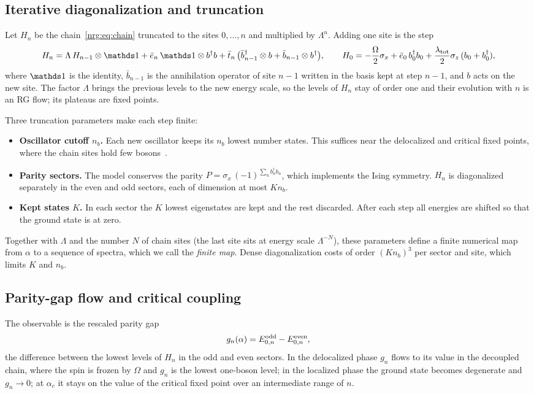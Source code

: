 \subsection{Iterative diagonalization and truncation}
Let $H_n$ be the chain~\eqref{nrg:eq:chain} truncated to the sites $0,\dots,n$ and multiplied by $\Lambda^n$. Adding one site is the step
\begin{equation}
H_{n}=\Lambda\,H_{n-1}\otimes\one+\bar e_n\,\one\otimes b^\dagger b
+\bar t_n\,\big(\bar b_{n-1}^\dagger\otimes b+\bar b_{n-1}\otimes b^\dagger\big),\qquad
H_0=-\frac{\Omega}{2}\sigma_x+\bar e_0\,b_0^\dagger b_0+\frac{\lambda_{\rm tot}}{2}\sigma_z\,(b_0+b_0^\dagger),
\label{nrg:eq:step}
\end{equation}
where $\one$ is the identity, $\bar b_{n-1}$ is the annihilation operator of site $n-1$ written in the basis kept at step $n-1$, and
$b$ acts on the new site. The factor $\Lambda$ brings the previous levels to the new energy scale, so the levels of $H_n$ stay of order
one and their evolution with $n$ is an RG flow; its plateaus are fixed points.

Three truncation parameters make each step finite:
\begin{itemize}
\item \textbf{Oscillator cutoff $n_b$.} Each new oscillator keeps its $n_b$ lowest number states. This suffices near the
  delocalized and critical fixed points, where the chain sites hold few bosons~\cite{nrg:Bulla2005}.
\item \textbf{Parity sectors.} The model conserves the parity $P=\sigma_x\,(-1)^{\sum_nb_n^\dagger b_n}$, which implements the Ising
  symmetry. $H_n$ is diagonalized separately in the even and odd sectors, each of dimension at most $Kn_b$.
\item \textbf{Kept states $K$.} In each sector the $K$ lowest eigenstates are kept and the rest discarded. After each step all
  energies are shifted so that the ground state is at zero.
\end{itemize}
Together with $\Lambda$ and the number $N$ of chain sites (the last site sits at energy scale $\Lambda^{-N}$), these parameters
define a finite numerical map from $\alpha$ to a sequence of spectra, which we call the \emph{finite map}. Dense diagonalization costs
of order $(Kn_b)^3$ per sector and site, which limits $K$ and $n_b$.

\subsection{Parity-gap flow and critical coupling}\label{nrg:sec:critical}
The observable is the rescaled parity gap
\begin{equation}
g_n(\alpha)=E^{\rm odd}_{0,n}-E^{\rm even}_{0,n},
\end{equation}
the difference between the lowest levels of $H_n$ in the odd and even sectors. In the delocalized phase $g_n$ flows to its value in
the decoupled chain, where the spin is frozen by $\Omega$ and $g_n$ is the lowest one-boson level; in the localized phase the ground
state becomes degenerate and $g_n\to0$; at $\alpha_c$ it stays on the value of the critical fixed point over an intermediate range
of $n$.

